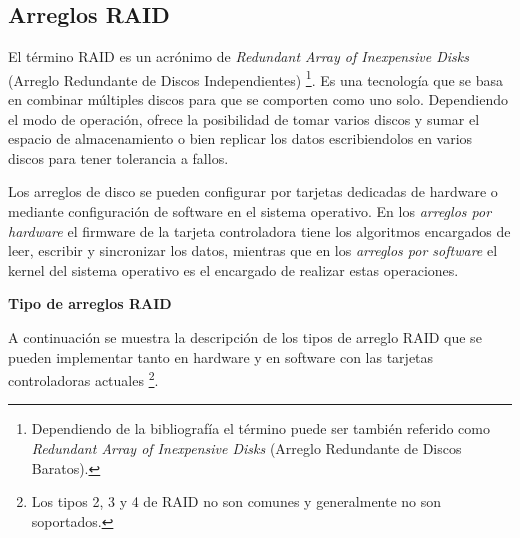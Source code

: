   \subsection {Arreglos RAID}

El t\'{e}rmino RAID es un acr\'{o}nimo de \emph{Redundant Array of Inexpensive Disks} (Arreglo Redundante de Discos Independientes) \cite{8810bc4904cabf93eede72a03c171b7e} \footnote{Dependiendo de la bibliograf\'{i}a el t\'{e}rmino puede ser tambi\'{e}n referido como \emph{Redundant Array of Inexpensive Disks} (Arreglo Redundante de Discos Baratos).}. Es una tecnolog\'{i}a que se basa en combinar m\'{u}ltiples discos para que se comporten como uno solo. Dependiendo el modo de operaci\'{o}n, ofrece la posibilidad de tomar varios discos y sumar el espacio de almacenamiento o bien replicar los datos escribiendolos en varios discos para tener tolerancia a fallos.

Los arreglos de disco se pueden configurar por tarjetas dedicadas de hardware o mediante configuraci\'{o}n de software en el sistema operativo. En los \emph{arreglos por hardware} el firmware de la tarjeta controladora tiene los algoritmos encargados de leer, escribir y sincronizar los datos, mientras que en los \emph{arreglos por software} el kernel del sistema operativo es el encargado de realizar estas operaciones.

\textbf{Tipo de arreglos RAID}

A continuaci\'{o}n se muestra la descripci\'{o}n de los tipos de arreglo RAID que se pueden implementar tanto en hardware y en software con las tarjetas controladoras actuales \footnote{Los tipos 2, 3 y 4 de RAID no son comunes y generalmente no son soportados.}. 

